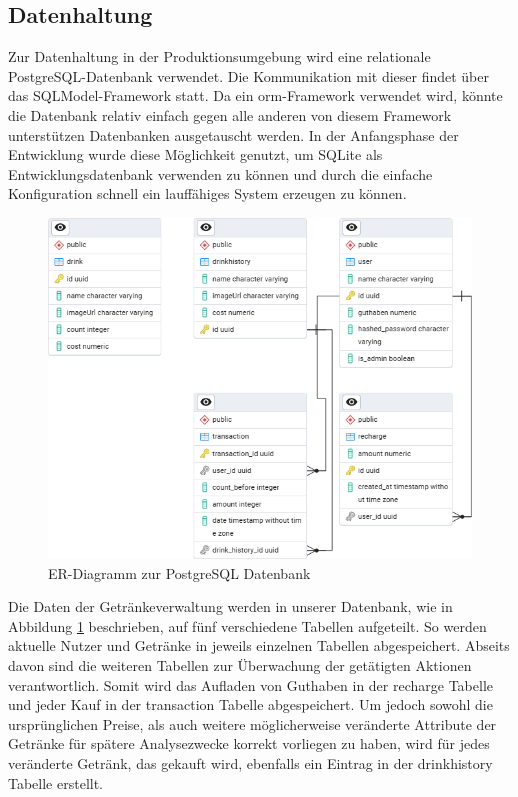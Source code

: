 \documentclass[conference,a4paper]{cs-techrep}
\begin{document}
\subsection{Datenhaltung} %
Zur Datenhaltung in der Produktionsumgebung wird eine relationale PostgreSQL-Datenbank verwendet. 
Die Kommunikation mit dieser findet über das SQLModel-Framework statt. 
Da ein \ac{orm}-Framework verwendet wird, könnte die Datenbank relativ einfach gegen alle anderen von diesem Framework unterstützen Datenbanken ausgetauscht werden. 
In der Anfangsphase der Entwicklung wurde diese Möglichkeit genutzt, um SQLite \cite{sqlite} als Entwicklungsdatenbank verwenden zu können und durch die einfache Konfiguration schnell ein lauffähiges System erzeugen zu können.
\begin{figure}[h]
	\centering
	\includegraphics[width=0.9\linewidth]{database_erd}
	\caption{ER-Diagramm zur PostgreSQL Datenbank}
	\label{fig:erd-modell-datenbank}
\end{figure}

Die Daten der Getränkeverwaltung werden in unserer Datenbank, wie in Abbildung \ref{fig:erd-modell-datenbank} beschrieben, auf fünf verschiedene Tabellen aufgeteilt. So werden aktuelle Nutzer und Getränke in jeweils einzelnen Tabellen abgespeichert. Abseits davon sind die weiteren Tabellen zur Überwachung der getätigten Aktionen verantwortlich. Somit wird das Aufladen von Guthaben in der recharge Tabelle und jeder Kauf in der transaction Tabelle abgespeichert. Um jedoch sowohl die ursprünglichen Preise, als auch weitere möglicherweise veränderte Attribute der Getränke für spätere Analysezwecke korrekt vorliegen zu haben, wird für jedes veränderte Getränk, das gekauft wird, ebenfalls ein Eintrag in der drinkhistory Tabelle erstellt.
\end{document}
